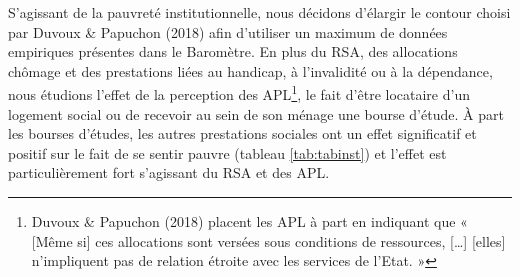 \documentclass[12pt,a4paper]{reedthesis}
\begin{document}
S'agissant de la pauvreté institutionnelle, nous décidons d'élargir le contour choisi par Duvoux \& Papuchon (2018) afin d'utiliser un maximum de données empiriques présentes dans le Baromètre. En plus du RSA, des allocations chômage et des prestations liées au handicap, à l'invalidité ou à la dépendance, nous étudions l'effet de la perception des APL\footnote{Duvoux \& Papuchon (2018) placent les APL à part en indiquant que « {[}Même si{]} ces allocations sont versées sous conditions de ressources, {[}\ldots{]} {[}elles{]} n'impliquent pas de relation étroite avec les services de l'Etat. »}, le fait d'être locataire d'un logement social ou de recevoir au sein de son ménage une bourse d'étude. À part les bourses d'études, les autres prestations sociales ont un effet significatif et positif sur le fait de se sentir pauvre (tableau \ref{tab:tabinst}) et l'effet est particulièrement fort s'agissant du RSA et des APL.
\end{document}
